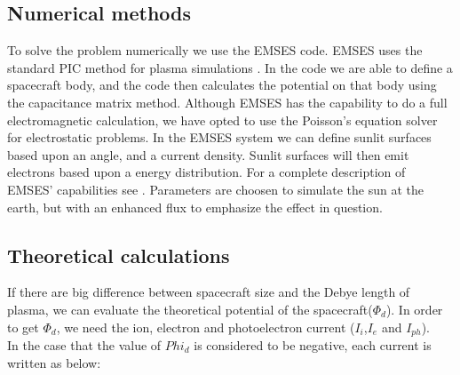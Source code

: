 \subsection{Numerical methods}

To solve the problem numerically we use the EMSES code. EMSES uses the standard PIC method for plasma simulations \citep{birdsall2004plasma}.
In the code we are able to define a spacecraft body, and the code then calculates the potential on that body using the capacitance matrix method.
Although EMSES has the capability to do a full electromagnetic calculation, we have opted to use the Poisson's equation
solver for electrostatic problems. In the EMSES system we can define sunlit surfaces based upon an angle, and a current
density. Sunlit surfaces will then emit electrons based upon a energy distribution. For a complete description of EMSES' capabilities
see \citep{nakashima_ohhelp:_2009}. Parameters are choosen to simulate the sun at the earth, but with an enhanced flux to emphasize the effect in question.

\subsection{Theoretical calculations}
\label{sec:theo_calc}

If there are big difference between spacecraft size and the Debye length of plasma, we can evaluate the theoretical potential of the spacecraft($\Phi_d$). In order to get $\Phi_d$, we need the ion, electron and photoelectron current (\(I_i\),\(I_e\) and \(I_{ph}\)).\\
In the case that the value of $Phi_d$ is considered to be negative, each current is written as below:

